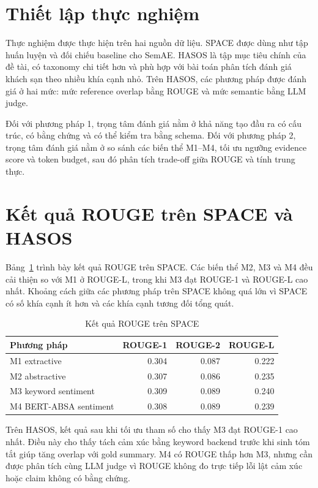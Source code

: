 \section{Thiết lập thực nghiệm}

Thực nghiệm được thực hiện trên hai nguồn dữ liệu. SPACE được dùng như tập huấn luyện và đối chiếu baseline cho SemAE. HASOS là tập mục tiêu chính của đề tài, có taxonomy chi tiết hơn và phù hợp với bài toán phân tích đánh giá khách sạn theo nhiều khía cạnh nhỏ. Trên HASOS, các phương pháp được đánh giá ở hai mức: mức reference overlap bằng ROUGE và mức semantic bằng LLM judge.

Đối với phương pháp 1, trọng tâm đánh giá nằm ở khả năng tạo đầu ra có cấu trúc, có bằng chứng và có thể kiểm tra bằng schema. Đối với phương pháp 2, trọng tâm đánh giá nằm ở so sánh các biến thể M1--M4, tối ưu ngưỡng evidence score và token budget, sau đó phân tích trade-off giữa ROUGE và tính trung thực.

\section{Kết quả ROUGE trên SPACE và HASOS}

Bảng~\ref{tab:space-rouge} trình bày kết quả ROUGE trên SPACE. Các biến thể M2, M3 và M4 đều cải thiện so với M1 ở ROUGE-L, trong khi M3 đạt ROUGE-1 và ROUGE-L cao nhất. Khoảng cách giữa các phương pháp trên SPACE không quá lớn vì SPACE có số khía cạnh ít hơn và các khía cạnh tương đối tổng quát.

\begin{table}[H]
\centering
\caption{Kết quả ROUGE trên SPACE}
\label{tab:space-rouge}
\begin{tabular}{l r r r}
\toprule
\textbf{Phương pháp} & \textbf{ROUGE-1} & \textbf{ROUGE-2} & \textbf{ROUGE-L} \\
\midrule
M1 extractive & 0.304 & 0.087 & 0.222 \\
M2 abstractive & 0.307 & 0.086 & 0.235 \\
M3 keyword sentiment & 0.309 & 0.089 & 0.240 \\
M4 BERT-ABSA sentiment & 0.308 & 0.089 & 0.239 \\
\bottomrule
\end{tabular}
\end{table}

Trên HASOS, kết quả sau khi tối ưu tham số cho thấy M3 đạt ROUGE-1 cao nhất. Điều này cho thấy tách cảm xúc bằng keyword backend trước khi sinh tóm tắt giúp tăng overlap với gold summary. M4 có ROUGE thấp hơn M3, nhưng cần được phân tích cùng LLM judge vì ROUGE không đo trực tiếp lỗi lật cảm xúc hoặc claim không có bằng chứng.

